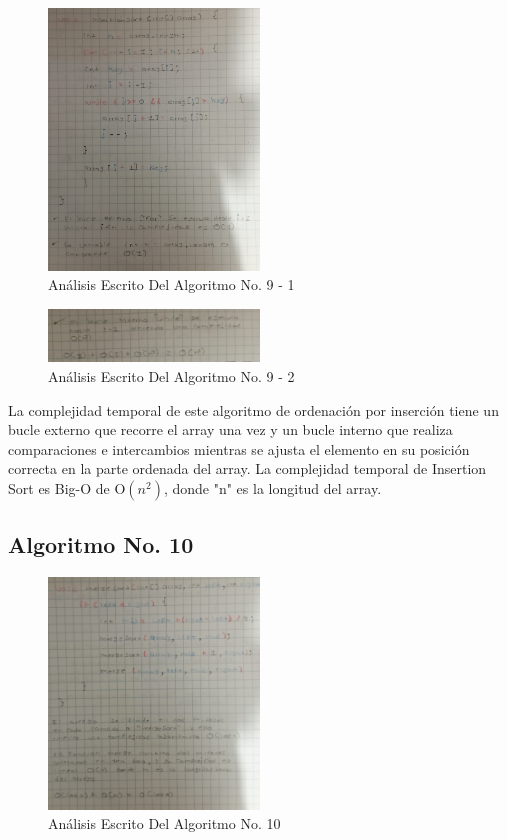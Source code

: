 \documentclass[journal, spanish]{IEEEtran}
\begin{document}
\begin{figure}[H]
  \centering
  \includegraphics[width=0.5\textwidth]{images/IMG_20230913_023543~3.jpg}
  \caption{Análisis Escrito Del Algoritmo No. 9 - 1}
  \label{fig:nombre_de_tu_imagen}
\end{figure}

\begin{figure}[H]
  \centering
  \includegraphics[width=0.5\textwidth]{images/IMG_20230913_023549~2.jpg}
  \caption{Análisis Escrito Del Algoritmo No. 9 - 2}
  \label{fig:nombre_de_tu_imagen}
\end{figure}

La complejidad temporal de este algoritmo de ordenación por inserción tiene un bucle externo que recorre el array una vez y un bucle interno que realiza comparaciones e intercambios mientras se ajusta el elemento en su posición correcta en la parte ordenada del array. La complejidad temporal de Insertion Sort es Big-O de O$(n^2)$, donde "n" es la longitud del array.

\subsection{Algoritmo No. 10}

\begin{figure}[H]
  \centering
  \includegraphics[width=0.5\textwidth]{images/IMG_20230913_023549~3.jpg}
  \caption{Análisis Escrito Del Algoritmo No. 10}
  \label{fig:nombre_de_tu_imagen}
\end{figure}
\end{document}
